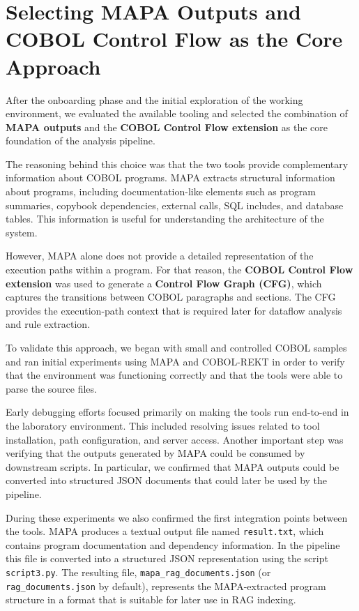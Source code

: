 \documentclass[11pt]{article}
\begin{document}
\section{Selecting MAPA Outputs and COBOL Control Flow as the Core Approach}
\label{sec:mapa}

After the onboarding phase and the initial exploration of the working environment, we evaluated the available tooling and selected the combination of \textbf{MAPA outputs} and the \textbf{COBOL Control Flow extension} as the core foundation of the analysis pipeline.

The reasoning behind this choice was that the two tools provide complementary information about COBOL programs. MAPA extracts structural information about programs, including documentation-like elements such as program summaries, copybook dependencies, external calls, SQL includes, and database tables. This information is useful for understanding the architecture of the system.

However, MAPA alone does not provide a detailed representation of the execution paths within a program. For that reason, the \textbf{COBOL Control Flow extension} was used to generate a \textbf{Control Flow Graph (CFG)}, which captures the transitions between COBOL paragraphs and sections. The CFG provides the execution-path context that is required later for dataflow analysis and rule extraction.

To validate this approach, we began with small and controlled COBOL samples and ran initial experiments using MAPA and COBOL-REKT in order to verify that the environment was functioning correctly and that the tools were able to parse the source files.

Early debugging efforts focused primarily on making the tools run end-to-end in the laboratory environment. This included resolving issues related to tool installation, path configuration, and server access. Another important step was verifying that the outputs generated by MAPA could be consumed by downstream scripts. In particular, we confirmed that MAPA outputs could be converted into structured JSON documents that could later be used by the pipeline.

During these experiments we also confirmed the first integration points between the tools. MAPA produces a textual output file named \texttt{result.txt}, which contains program documentation and dependency information. In the pipeline this file is converted into a structured JSON representation using the script \texttt{script3.py}. The resulting file, \texttt{mapa\_rag\_documents.json} (or \texttt{rag\_documents.json} by default), represents the MAPA-extracted program structure in a format that is suitable for later use in RAG indexing.
\end{document}
